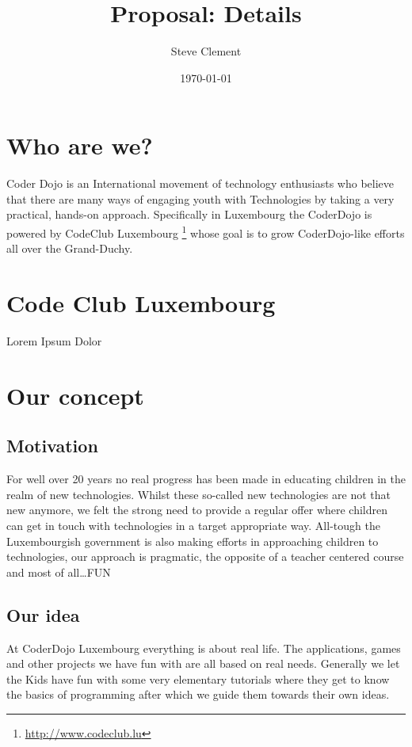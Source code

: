 \documentclass{proposal}
\title{Proposal: Details}
\author{Steve Clement}
\date{\today}
\begin{document}
\newpage

\maketitle

\newpage

\section*{Who are we?}

Coder Dojo is an International movement of technology enthusiasts who believe that there are many ways of engaging youth with Technologies by taking a very practical, hands-on approach.
Specifically in Luxembourg the CoderDojo is powered by CodeClub Luxembourg \footnote{\url{http://www.codeclub.lu}} whose goal is to grow CoderDojo-like efforts all over the Grand-Duchy.

\section*{Code Club Luxembourg}

Lorem Ipsum Dolor

\section*{Our concept}

\subsection*{Motivation}
For well over 20 years no real progress has been made in educating children in the realm of new technologies.
Whilst these so-called new technologies are not that new anymore, we felt the strong need to provide a regular offer where children can get in touch with technologies in a target appropriate way.
All-tough the Luxembourgish government is also making efforts in approaching children to technologies, our approach is pragmatic, the opposite of a teacher centered course and most of all\ldots FUN

\subsection*{Our idea}
At CoderDojo Luxembourg everything is about real life. The applications, games and other projects we have fun with are all based on real needs. Generally we let the Kids have fun with some very elementary tutorials where they get to know the basics of programming after which we guide them towards their own ideas.
\end{document}
